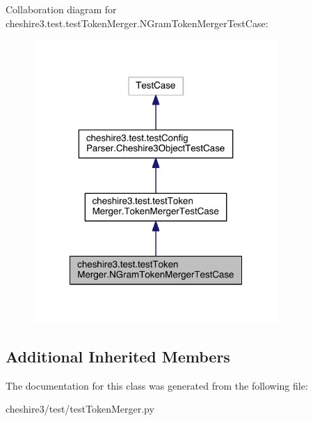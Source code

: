 Collaboration diagram for cheshire3.\-test.\-test\-Token\-Merger.\-N\-Gram\-Token\-Merger\-Test\-Case\-:
\nopagebreak
\begin{figure}[H]
\begin{center}
\leavevmode
\includegraphics[width=264pt]{classcheshire3_1_1test_1_1test_token_merger_1_1_n_gram_token_merger_test_case__coll__graph}
\end{center}
\end{figure}
\subsection*{Additional Inherited Members}


The documentation for this class was generated from the following file\-:\begin{DoxyCompactItemize}
\item 
cheshire3/test/test\-Token\-Merger.\-py\end{DoxyCompactItemize}
